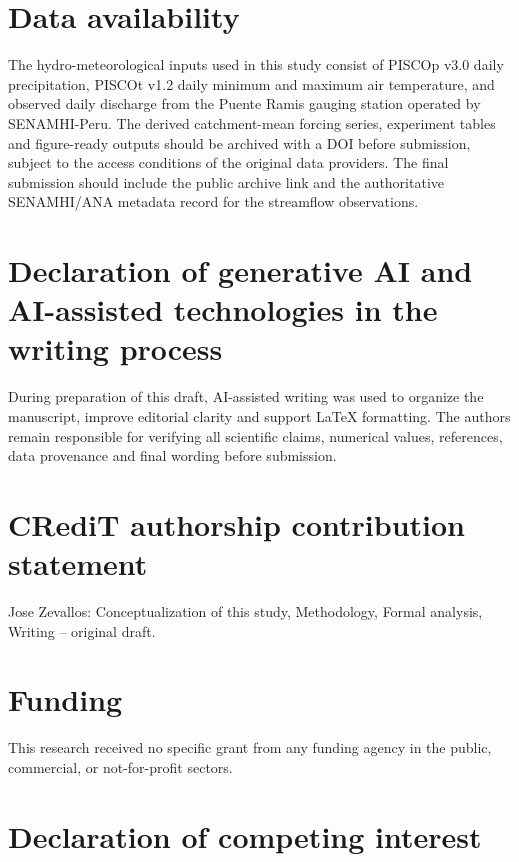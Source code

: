 \documentclass[a4paper,fleqn]{cas-sc}
\begin{document}
\section*{Data availability}

The hydro-meteorological inputs used in this study consist of PISCOp v3.0 daily precipitation, PISCOt v1.2 daily minimum and maximum air temperature, and observed daily discharge from the Puente Ramis gauging station operated by SENAMHI-Peru. The derived catchment-mean forcing series, experiment tables and figure-ready outputs should be archived
with a DOI before submission, subject to the access conditions of the original data providers. The final submission should include the public archive link and the authoritative SENAMHI/ANA metadata record for the streamflow observations.

\section*{Declaration of generative AI and AI-assisted technologies
in the writing process}

During preparation of this draft, AI-assisted writing was used to
organize the manuscript, improve editorial clarity and support LaTeX
formatting. The authors remain
responsible for verifying all scientific claims, numerical values,
references, data provenance and final wording before submission.

\section*{CRediT authorship contribution statement}

Jose Zevallos: Conceptualization of this study, Methodology, Formal
analysis, Writing -- original draft.

\section*{Funding}
This research received no specific grant from any funding agency in the public, commercial, or not-for-profit sectors.

\section*{Declaration of competing interest}
\end{document}
